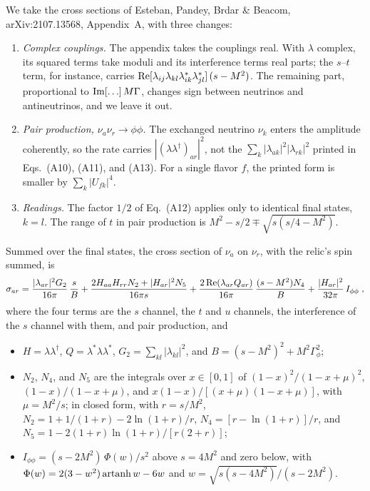 \documentclass[11pt]{article}
\begin{document}
We take the cross sections of Esteban, Pandey, Brdar \& Beacom, arXiv:2107.13568, Appendix~A, with three changes:
\begin{enumerate}
 \item \textit{Complex couplings.} The appendix takes the couplings real. With $\lambda$ complex, its squared terms take moduli and its interference terms real parts; the $s$--$t$ term, for instance, carries ${\rm Re}[\lambda_{ij}\lambda_{kl}\lambda^\ast_{ik}\lambda^\ast_{jl}]\,(s - M^2)$. The remaining part, proportional to ${\rm Im}[\ldots]\, M\Gamma$, changes sign between neutrinos and antineutrinos, and we leave it out.
 \item \textit{Pair production, $\nu_a \nu_r \to \phi\phi$.} The exchanged neutrino $\nu_k$ enters the amplitude coherently, so the rate carries $|(\lambda\lambda^\dagger)_{ar}|^2$, not the $\sum_k |\lambda_{ak}|^2 |\lambda_{rk}|^2$ printed in Eqs.~(A10), (A11), and (A13). For a single flavor $f$, the printed form is smaller by $\sum_k |U_{fk}|^4$.
 \item \textit{Readings.} The factor $1/2$ of Eq.~(A12) applies only to identical final states, $k = l$. The range of $t$ in pair production is $M^2 - s/2 \mp \sqrt{s(s/4 - M^2)}$.
\end{enumerate}
Summed over the final states, the cross section of $\nu_a$ on $\nu_r$, with the relic's spin summed, is
\begin{equation}
 \label{equ:sigma_scalar}
 \sigma_{ar} = \frac{|\lambda_{ar}|^2 G_2}{16\pi}\,\frac{s}{B}
 + \frac{2 H_{aa} H_{rr} N_2 + |H_{ar}|^2 N_5}{16\pi s}
 + \frac{2\,{\rm Re}(\lambda_{ar} Q_{ar})}{16\pi}\,\frac{(s - M^2) N_4}{B}
 + \frac{|H_{ar}|^2}{32\pi}\, I_{\phi\phi} \;,
\end{equation}
where the four terms are the $s$ channel, the $t$ and $u$ channels, the interference of the $s$ channel with them, and pair production, and
\begin{itemize}
 \item $H = \lambda\lambda^\dagger$, $Q = \lambda^\ast \lambda \lambda^\ast$, $G_2 = \sum_{kl} |\lambda_{kl}|^2$, and $B = (s - M^2)^2 + M^2\Gamma_\phi^2$;
 \item $N_2$, $N_4$, and $N_5$ are the integrals over $x \in [0, 1]$ of $(1-x)^2/(1-x+\mu)^2$, $(1-x)/(1-x+\mu)$, and $x(1-x)/[(x+\mu)(1-x+\mu)]$, with $\mu = M^2/s$; in closed form, with $r = s/M^2$,
 $N_2 = 1 + 1/(1+r) - 2\ln(1+r)/r$, $N_4 = [r - \ln(1+r)]/r$, and $N_5 = 1 - 2(1+r)\ln(1+r)/[r(2+r)]$;
 \item $I_{\phi\phi} = (s - 2M^2)\, \Phi(w)/s^2$ above $s = 4M^2$ and zero below, with $\Phi(w) = 2(3 - w^2)\,{\rm artanh}\, w - 6w$ and $w = \sqrt{s(s - 4M^2)}/(s - 2M^2)$.
\end{itemize}
\end{document}
